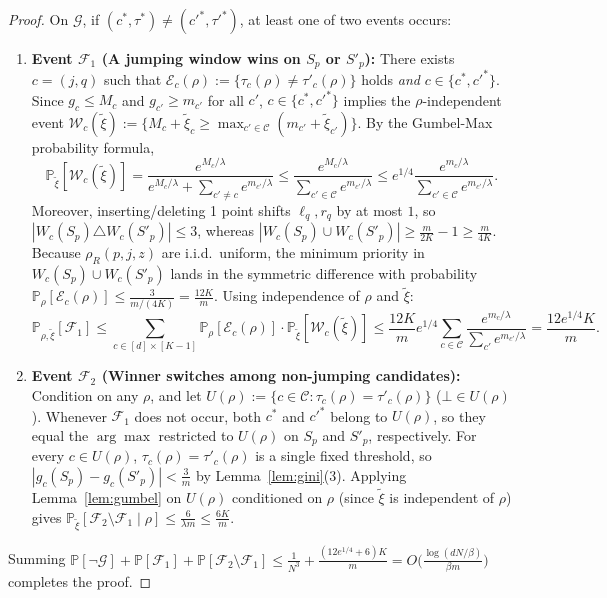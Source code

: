 \documentclass[11pt]{article}
\theoremstyle{definition}
\newcommand{\Prob}{\mathbb{P}}
\newcommand{\calC}{\mathcal{C}}
\newcommand{\calE}{\mathcal{E}}
\newcommand{\calF}{\mathcal{F}}
\newcommand{\calG}{\mathcal{G}}
\newcommand{\calW}{\mathcal{W}}
\begin{document}
\begin{proof}
On $\calG$, if $(c^*, \tau^*) \ne (c'^*, \tau'^*)$, at least one of two events occurs:
\begin{enumerate}[leftmargin=1.5em,itemsep=2pt]
    \item \textbf{Event $\calF_1$ (A jumping window wins on $S_p$ or $S'_p$):} There exists $c = (j, q)$ such that $\calE_c(\rho) := \{\tau_c(\rho) \ne \tau'_c(\rho)\}$ holds \emph{and} $c \in \{c^*, c'^*\}$. Since $g_c \le M_c$ and $g_{c'} \ge m_{c'}$ for all $c'$, $c \in \{c^*, c'^*\}$ implies the $\rho$-independent event $\calW_c(\tilde{\xi}) := \{M_c + \tilde{\xi}_c \ge \max_{c' \in \calC} (m_{c'} + \tilde{\xi}_{c'})\}$. By the Gumbel-Max probability formula,
    \[
        \Prob_{\tilde{\xi}}[\calW_c(\tilde{\xi})] = \frac{e^{M_c / \lambda}}{e^{M_c/\lambda} + \sum_{c' \ne c} e^{m_{c'}/\lambda}} \le \frac{e^{M_c/\lambda}}{\sum_{c' \in \calC} e^{m_{c'}/\lambda}} \le e^{1/4} \frac{e^{m_c/\lambda}}{\sum_{c' \in \calC} e^{m_{c'}/\lambda}}.
    \]
    Moreover, inserting/deleting 1 point shifts $\ell_q, r_q$ by at most $1$, so $|W_c(S_p) \triangle W_c(S'_p)| \le 3$, whereas $|W_c(S_p) \cup W_c(S'_p)| \ge \frac{m}{2K} - 1 \ge \frac{m}{4K}$. Because $\rho_R(p, j, z)$ are i.i.d.\ uniform, the minimum priority in $W_c(S_p) \cup W_c(S'_p)$ lands in the symmetric difference with probability $\Prob_\rho[\calE_c(\rho)] \le \frac{3}{m/(4K)} = \frac{12K}{m}$. Using independence of $\rho$ and $\tilde{\xi}$:
    \[
        \Prob_{\rho, \tilde{\xi}}[\calF_1] \le \sum_{c \in [d]\times[K-1]} \Prob_\rho[\calE_c(\rho)] \cdot \Prob_{\tilde{\xi}}[\calW_c(\tilde{\xi})] \le \frac{12K}{m} e^{1/4} \sum_{c \in \calC} \frac{e^{m_c/\lambda}}{\sum_{c'} e^{m_{c'}/\lambda}} = \frac{12 e^{1/4} K}{m}.
    \]
    \item \textbf{Event $\calF_2$ (Winner switches among non-jumping candidates):} Condition on any $\rho$, and let $U(\rho) := \{c \in \calC : \tau_c(\rho) = \tau'_c(\rho)\}$ ($\bot \in U(\rho)$). Whenever $\calF_1$ does not occur, both $c^*$ and $c'^*$ belong to $U(\rho)$, so they equal the $\arg\max$ restricted to $U(\rho)$ on $S_p$ and $S'_p$, respectively. For every $c \in U(\rho)$, $\tau_c(\rho) = \tau'_c(\rho)$ is a single fixed threshold, so $|g_c(S_p) - g_c(S'_p)| < \frac{3}{m}$ by Lemma~\ref{lem:gini}(3). Applying Lemma~\ref{lem:gumbel} on $U(\rho)$ conditioned on $\rho$ (since $\tilde{\xi}$ is independent of $\rho$) gives $\Prob_{\tilde{\xi}}[\calF_2 \setminus \calF_1 \mid \rho] \le \frac{6}{\lambda m} \le \frac{6K}{m}$.
\end{enumerate}
Summing $\Prob[\neg\calG] + \Prob[\calF_1] + \Prob[\calF_2 \setminus \calF_1] \le \frac{1}{N^3} + \frac{(12 e^{1/4} + 6)K}{m} = O\big(\frac{\log(dN/\beta)}{\beta m}\big)$ completes the proof.
\end{proof}
\end{document}

